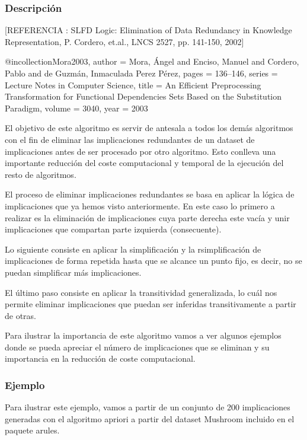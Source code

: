 \subsubsection{Descripci\'on} 

[REFERENCIA :  
SLFD Logic: Elimination of Data Redundancy in Knowledge Representation, P. Cordero, et.al., LNCS 2527, pp. 141-150, 2002]

@incollection{Mora2003,
author = {Mora, {\'{A}}ngel and Enciso, Manuel and Cordero, Pablo and de Guzm{\'{a}}n, Inmaculada Perez P{\'{e}}rez},
pages = {136--146},
series = {Lecture Notes in Computer Science},
title = {{An Efficient Preprocessing Transformation for Functional Dependencies Sets Based on the Substitution Paradigm}},
volume = {3040},
year = {2003}
}

El objetivo de este algoritmo es servir de antesala a todos los dem\'as algoritmos con el fin de eliminar las implicaciones redundantes de un dataset de implicaciones antes de ser procesado por otro algoritmo. Esto conlleva una importante reducci\'on del coste computacional y temporal de la ejecuci\'on del resto de algoritmos.

El proceso de eliminar implicaciones redundantes se basa en aplicar la l\'ogica de implicaciones que ya hemos visto anteriormente. En este caso lo primero a realizar es la eliminaci\'on de implicaciones cuya parte derecha este vac\'ia y unir implicaciones que compartan parte izquierda (consecuente).

Lo siguiente consiste en aplicar la simplificaci\'on y la rsimplificaci\'on de implicaciones de forma repetida hasta que se alcance un punto fijo, es decir, no se puedan simplificar m\'as implicaciones.

El \'ultimo paso consiste en aplicar la transitividad generalizada, lo cu\'al nos permite eliminar implicaciones que puedan ser inferidas transitivamente a partir de otras.

Para ilustrar la importancia de este algoritmo vamos a ver algunos ejemplos donde se pueda apreciar el n\'umero de implicaciones que se eliminan y su importancia en la reducci\'on de coste computacional.

\subsubsection{Ejemplo}

Para ilustrar este ejemplo, vamos a partir de un conjunto de 200 implicaciones generadas con el algoritmo apriori a partir del dataset Mushroom incluido en el paquete arules.

